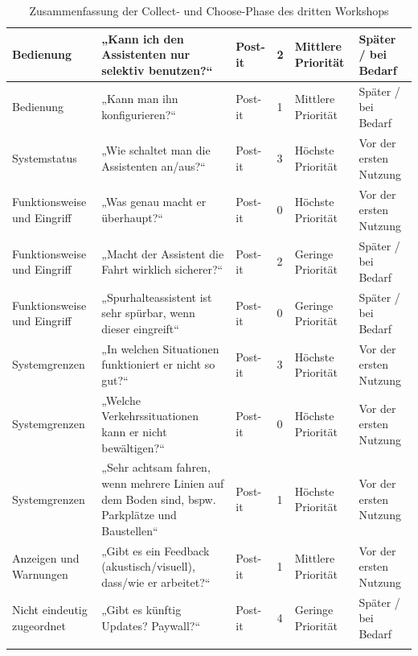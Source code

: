 {\begin{xltabular}{\textwidth}{
    |P{2.5cm}
    |Y
    |P{1.4cm}
    |P{1.2cm}
    |P{2.0cm}
    |P{2.4cm}|
}
Bedienung &
„Kann ich den Assistenten nur selektiv benutzen?“ &
Post-it &
2 &
Mittlere Priorität &
Später / bei Bedarf
\\
\hline

Bedienung &
„Kann man ihn konfigurieren?“ &
Post-it &
1 &
Mittlere Priorität &
Später / bei Bedarf
\\
\hline

Systemstatus &
„Wie schaltet man die Assistenten an/aus?“ &
Post-it &
3 &
Höchste Priorität &
Vor der ersten Nutzung
\\
\hline

Funktionsweise und Eingriff &
„Was genau macht er überhaupt?“ &
Post-it &
0 &
Höchste Priorität &
Vor der ersten Nutzung
\\
\hline

Funktionsweise und Eingriff &
„Macht der Assistent die Fahrt wirklich sicherer?“ &
Post-it &
2 &
Geringe Priorität &
Später / bei Bedarf
\\
\hline

Funktionsweise und Eingriff &
„Spurhalteassistent ist sehr spürbar, wenn dieser eingreift“ &
Post-it &
0 &
Geringe Priorität &
Später / bei Bedarf
\\
\hline

Systemgrenzen &
„In welchen Situationen funktioniert er nicht so gut?“ &
Post-it &
3 &
Höchste Priorität &
Vor der ersten Nutzung
\\
\hline

Systemgrenzen &
„Welche Verkehrssituationen kann er nicht bewältigen?“ &
Post-it &
0 &
Höchste Priorität &
Vor der ersten Nutzung
\\
\hline

Systemgrenzen &
„Sehr achtsam fahren, wenn mehrere Linien auf dem Boden sind, bspw. Parkplätze und Baustellen“ &
Post-it &
1 &
Höchste Priorität &
Vor der ersten Nutzung
\\
\hline

Anzeigen und Warnungen &
„Gibt es ein Feedback (akustisch/visuell), dass/wie er arbeitet?“ &
Post-it &
1 &
Mittlere Priorität &
Vor der ersten Nutzung
\\
\hline

Nicht eindeutig zugeordnet &
„Gibt es künftig Updates? Paywall?“ &
Post-it &
4 &
Geringe Priorität &
Später / bei Bedarf
\\
\hline

\caption{Zusammenfassung der Collect- und Choose-Phase des dritten Workshops}
\label{tab:workshop3_collect_choose}
\\

\end{xltabular}
}

